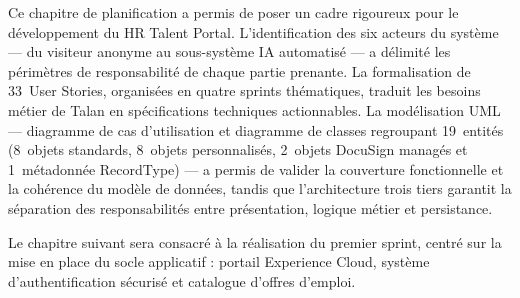Ce chapitre de planification a permis de poser un cadre rigoureux pour le développement du HR Talent Portal. L'identification des six acteurs du système --- du visiteur anonyme au sous-système IA automatisé --- a délimité les périmètres de responsabilité de chaque partie prenante. La formalisation de 33~User Stories, organisées en quatre sprints thématiques, traduit les besoins métier de Talan en spécifications techniques actionnables. La modélisation UML --- diagramme de cas d'utilisation et diagramme de classes regroupant 19~entités (8~objets standards, 8~objets personnalisés, 2~objets DocuSign managés et 1~métadonnée RecordType) --- a permis de valider la couverture fonctionnelle et la cohérence du modèle de données, tandis que l'architecture trois tiers garantit la séparation des responsabilités entre présentation, logique métier et persistance.

\medskip

Le chapitre suivant sera consacré à la réalisation du premier sprint, centré sur la mise en place du socle applicatif : portail Experience Cloud, système d'authentification sécurisé et catalogue d'offres d'emploi.

